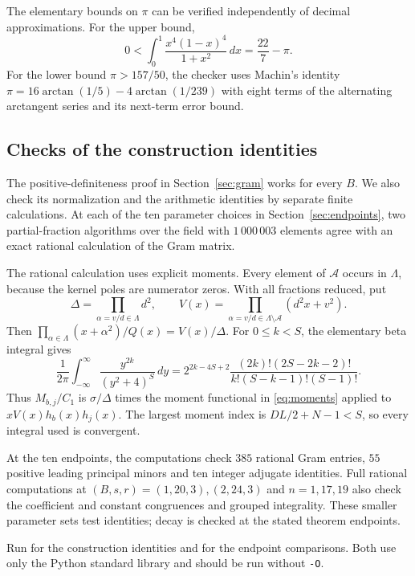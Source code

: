 The elementary bounds on $\pi$ can be verified independently of
decimal approximations. For the upper bound,
\[
 0<\int_0^1\frac{x^4(1-x)^4}{1+x^2}\,dx=\frac{22}{7}-\pi.
\]
For the lower bound $\pi>157/50$, the checker uses Machin's identity
$\pi=16\arctan(1/5)-4\arctan(1/239)$ with eight terms of the
alternating arctangent series and its next-term error bound.

\subsection{Checks of the construction identities}

The positive-definiteness proof in Section~\ref{sec:gram} works for
every $B$. We also check its normalization and the arithmetic
identities by separate finite calculations. At each of the ten
parameter choices in Section~\ref{sec:endpoints}, two partial-fraction
algorithms over the field with $1\,000\,003$ elements agree with
an exact rational calculation of the Gram matrix.

The rational calculation uses explicit moments. Every element of
$\mathcal A$ occurs in $\Lambda$, because the kernel poles are
numerator zeros. With all fractions reduced, put
\[
 \Delta=\prod_{\alpha=v/d\in\Lambda}d^2,\qquad
 V(x)=\prod_{\alpha=v/d\in\Lambda\setminus\mathcal A}(d^2x+v^2).
\]
Then $\prod_{\alpha\in\Lambda}(x+\alpha^2)/Q(x)=V(x)/\Delta$.
For $0\le k<S$, the elementary beta integral gives
\begin{equation}\label{eq:moments}
 \frac1{2\pi}\int_{-\infty}^{\infty}
                   \frac{y^{2k}}{(y^2+4)^S}\,dy
 =2^{2k-4S+2}\frac{(2k)!(2S-2k-2)!}{k!(S-k-1)!(S-1)!}.
\end{equation}
Thus $M_{b,j}/C_1$ is $\sigma/\Delta$ times the moment functional
in \eqref{eq:moments} applied to $xV(x)h_b(x)h_j(x)$. The largest
moment index is $DL/2+N-1<S$, so every integral used is convergent.

At the ten endpoints, the computations check $385$ rational Gram
entries, $55$ positive leading principal minors and ten integer
adjugate identities. Full rational computations at
$(B,s,r)=(1,20,3),(2,24,3)$ and $n=1,17,19$ also check the
coefficient and constant congruences and grouped integrality.
These smaller parameter sets test identities; decay is checked
at the stated theorem endpoints.

Run  for the construction
identities and  for the endpoint
comparisons. Both use only the Python standard library and should
be run without \texttt{-O}.

